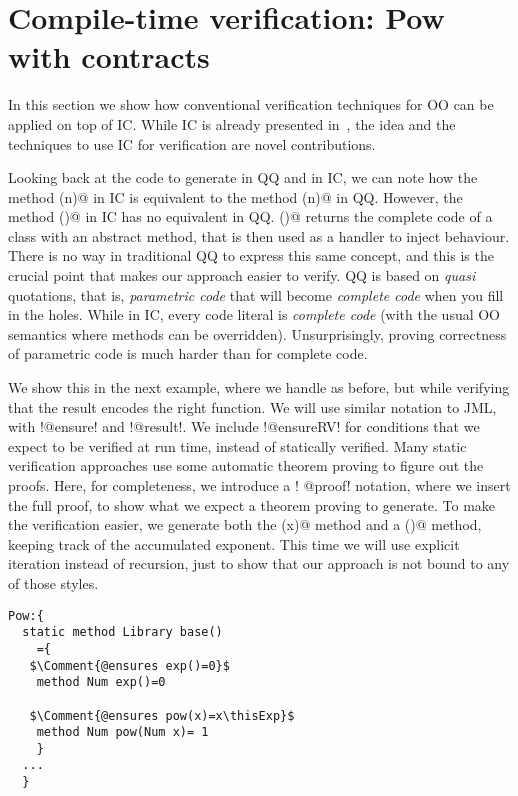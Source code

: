 \section{Compile-time verification: Pow with contracts}
In this section we show how conventional verification techniques for OO can be applied on top of IC.
While IC is already presented in~\cite{servetto2014meta},
the idea and the techniques to use IC for verification are novel contributions.

Looking back at the code to generate \Q@pow@ in QQ and in IC,
we can
note how the method \Q@inductive(n)@ in IC is equivalent to the method
\Q@inductive(n)@ in QQ.
However,
the method \Q@inductive()@ in IC has no equivalent in QQ.
\Q@inductive()@ returns the complete code of a class with an abstract method,
that is then used as a handler to inject behaviour.
There is no way in traditional QQ to express this same concept,
and this is the crucial point that makes our approach easier to verify.
QQ is based on \emph{quasi} quotations, that is, \emph{parametric code} that
will become \emph{complete code} when you fill in the holes.
While in IC, every code literal is \emph{complete code} (with
the usual OO semantics where methods can be overridden).
Unsurprisingly, proving correctness of parametric code is much harder
than for complete code.

We show this in the next example, where we handle \Q@pow@ as before, but while verifying that the
result encodes the right \Q@pow@ function. We will use similar notation to JML, with \Q!@ensure! and \Q!@result!.
We include \Q!@ensureRV! for conditions that we expect to be verified at run time, instead of statically verified.
Many static verification approaches use some automatic theorem proving to figure out the proofs. Here, for completeness, we introduce a 
\Q! @proof! notation, where we insert the full proof, to show what we expect a theorem proving to generate.
To make the verification easier, we generate both the \Q@pow(x)@ method
and a \Q@exp()@ method, keeping track of the accumulated exponent.
This time we will use explicit iteration instead of recursion, just to show that our approach is not bound to any of those styles.
\newcommand\thisExp{\ensuremath{{}^{\textbf{this.exp()}}}}
\newcommand\thisSuperExp{\ensuremath{{}^{\textbf{this.superExp()}}}}
\newcommand\oneThisSuperExp{\ensuremath{{}^{\textbf{1+this.superExp()}}}}
\newcommand\powerY{\ensuremath{{}^{\textbf{y}}}}

\begin{lstlisting}
Pow:{
  static method Library base()
    ={
   $\Comment{@ensures exp()=0}$
    method Num exp()=0 
    
   $\Comment{@ensures pow(x)=x\thisExp}$
    method Num pow(Num x)= 1 
    }
  ...
  }
\end{lstlisting}

